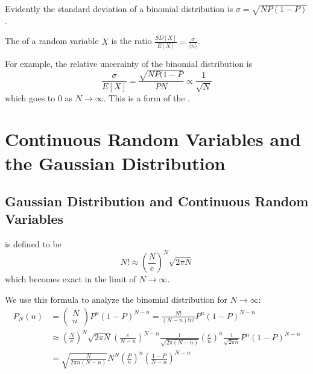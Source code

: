 \documentclass[12pt, a4paper, oneside, openright, titlepage]{book}
\begin{document}
Evidently the standard deviation of a binomial distribution is $\sigma = \sqrt{NP(1-P)}$.

\begin{defn}
    The  of a random variable $X$ is the ratio $\frac{SD[X]}{E[X]} = \frac{\sigma}{\langle n \rangle}$.
\end{defn}


For example, the relative uncerainty of the binomial distribution is \begin{equation*}
    \frac{\sigma}{E[X]} = \frac{\sqrt{NP(1-P}}{PN} \propto \frac{1}{\sqrt{N}}
\end{equation*}
which goes to $0$ as $N\rightarrow \infty$. This is a form of the .


\chapter{Continuous Random Variables and the Gaussian Distribution}

\section{Gaussian Distribution and Continuous Random Variables}

\begin{defn}
     is defined to be \begin{equation*}
        N! \approx \left(\frac{N}{e}\right)^N\sqrt{2\pi N}
    \end{equation*}
    which becomes exact in the limit of $N\rightarrow \infty$.
\end{defn}
We use this formula to analyze the binomial distribution for $N\rightarrow \infty$: \begin{align*}
    P_N(n) &= \begin{pmatrix} N \\ n\end{pmatrix} P^n(1-P)^{N-n} = \frac{N!}{(N-n)!n!}P^n(1-P)^{N-n} \\
        &\approx \left(\frac{N}{e}\right)^N\sqrt{2\pi N}\left(\frac{e}{N-n}\right)^{N-n}\frac{1}{\sqrt{2\pi(N-n)}}\left(\frac{e}{n}\right)^n\frac{1}{\sqrt{2\pi n}}P^n(1-P)^{N-n} \\
        &= \sqrt{\frac{N}{2\pi n(N-n)}}N^N\left(\frac{P}{n}\right)^n\left(\frac{1-P}{N-n}\right)^{N-n}
\end{align*}
\end{document}
